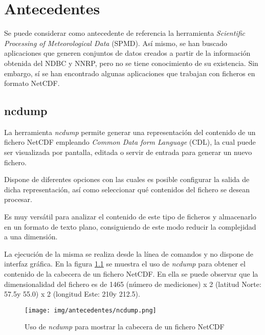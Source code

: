 
\chapter{Antecedentes}

	\begin{onehalfspace}
	
		Se puede considerar como antecedente de referencia la herramienta \textit{Scientific Processing of Meteorological Data} (SPMD). Así mismo, se han buscado aplicaciones que generen conjuntos de datos creados a partir de la información obtenida del NDBC y NNRP, pero no se tiene conocimiento de su existencia. Sin embargo, sí se han encontrado algunas aplicaciones que trabajan con ficheros en formato NetCDF.
		
		\section{ncdump}

			La herramienta \textit{ncdump} \cite{Ncdump2017} permite generar una representación del contenido de un fichero NetCDF empleando \textit{Common Data form Language} (CDL), la cual puede ser visualizada por pantalla, editada o servir de entrada para generar un nuevo fichero.
			
			Dispone de diferentes opciones con las cuales es posible configurar la salida de dicha representación, así como seleccionar qué contenidos del fichero se desean procesar.
			
			Es muy versátil para analizar el contenido de este tipo de ficheros y almacenarlo en un formato de texto plano, consiguiendo de este modo reducir la complejidad a una dimensión.
			
			La ejecución de la misma se realiza desde la línea de comandos y no dispone de interfaz gráfica. En la figura \ref{figura:ncdump} se muestra el uso de \textit{ncdump} para obtener el contenido de la cabecera de un fichero NetCDF. En ella se puede observar que la dimensionalidad del fichero es de 1465 (número de mediciones) x 2 (latitud Norte: 57.5\degree \space y 55.0\degree) x 2 (longitud Este: 210\degree \space y 212.5\degree).
			
			
			\begin{figure}
				\centering
			   \texttt{[image: img/antecedentes/ncdump.png]}
				\caption{Uso de \textit{ncdump} para mostrar la cabecera de un fichero NetCDF}
				\label{figura:ncdump}
			\end{figure}

	\end{onehalfspace}
